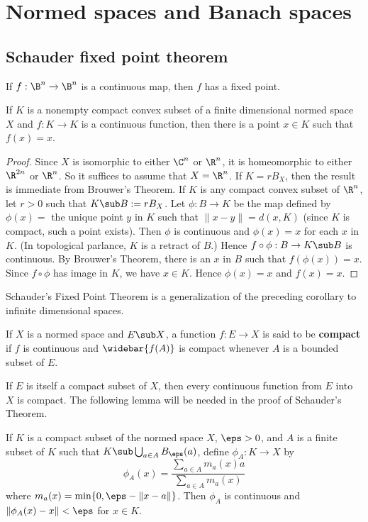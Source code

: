 \section{Normed spaces and Banach spaces}
\subsection{Schauder fixed point theorem}
\begin{theorem}
If $f:\B^n\to\B^n$ is a continuous map, then $f$ has a fixed point.
\end{theorem}
\begin{corollary}\label{NVS finite dim fix point thm}
If $K$ is a nonempty compact convex subset of a finite dimensional normed space $X$ and $f:K\to K$ is a continuous function, then there is a point $x\in K$ such that $f(x)=x$.
\end{corollary}
\begin{proof}
Since $X$ is isomorphic to either $\C^n$ or $\R^n$, it is homeomorphic to either $\R^{2n}$ or $\R^n$. So it suffices to assume that $X=\R^n$. If $K=rB_{X}$, then the result is immediate from Brouwer's Theorem. If $K$ is any compact convex subset of $\R^n$, let $r>0$ such that $K\sub B:=rB_X$. Let $\phi:B\to K$ be the map defined by $\phi(x)=$ the unique point $y$ in $K$ such that $\|x-y\|=d(x,K)$ (since $K$ is compact, such a point exists). Then $\phi$ is continuous and $\phi(x)=x$ for each $x$ in $K$. (In topological parlance, $K$ is a retract of $B$.) Hence $f\circ\phi:B\to K\sub B$ is continuous. By Brouwer's Theorem, there is an $x$ in $B$ such that $f(\phi(x))=x$. Since $f\circ\phi$ has image in $K$, we have $x\in K$. Hence $\phi(x)=x$ and $f(x)=x$.
\end{proof}
Schauder's Fixed Point Theorem is a generalization of the preceding corollary to infinite dimensional spaces.
\begin{definition}
If $X$ is a normed space and $E\sub X$, a function $f:E\to X$ is said to be \textbf{compact} if $f$ is continuous and $\widebar{f(A)}$ is compact whenever $A$ is a bounded subset of $E$.
\end{definition}
If $E$ is itself a compact subset of $X$, then every continuous function from $E$ into $X$ is compact. The following lemma will be needed in the proof of Schauder's Theorem.
\begin{lemma}\label{NVS convex hull of compact lemma}
If $K$ is a compact subset of the normed space $X$, $\eps>0$, and $A$ is a finite subset of $K$ such that $K\sub\bigcup_{a\in A}B_\eps(a)$, define $\phi_A:K\to X$ by
\[\phi_A(x)=\frac{\sum_{a\in A}m_a(x)a}{\sum_{a\in A}m_a(x)}\]
where $m_a(x)=\min\{0,\eps-\|x-a\|\}$. Then $\phi_A$ is continuous and $\|\phi_A(x)-x\|<\eps$ for $x\in K$.
\end{lemma}
